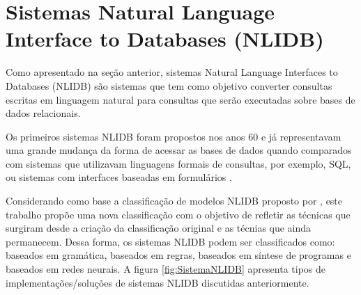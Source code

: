 \documentclass{article}
\begin{document}



\section{Sistemas Natural Language Interface to Databases (NLIDB)\label{sistemasNLIDB}}

Como apresentado na seção anterior, sistemas Natural Language Interfaces to Databases (NLIDB) são sistemas que tem como objetivo converter consultas escritas em linguagem natural para consultas que serão executadas sobre bases de dados relacionais.

Os primeiros sistemas NLIDB foram propostos nos anos 60 e já representavam uma grande mudança da forma de acessar as bases de dados quando comparados com sistemas que utilizavam linguagens formais de consultas, por exemplo, SQL, ou sistemas com interfaces baseadas em formulários \citep{androutsopoulos1995natural}.


Considerando como base a classificação de modelos NLIDB proposto por \citep{androutsopoulos1995natural}, este trabalho propõe uma nova classificação com o objetivo de refletir as técnicas que surgiram desde a criação da classificação original e as técnias que ainda permanecem. Dessa forma, os sistemas NLIDB podem ser classificados como: baseados em gramática, baseados em regras, baseados em síntese de programas e baseados em redes neurais. A figura \ref{fig:SistemaNLIDB} apresenta tipos de implementações/soluções de sistemas NLIDB discutidas anteriormente.\\
\end{document}
